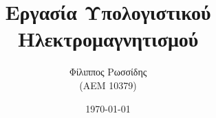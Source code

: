 \documentclass[10pt, letterpaper]{article}
\title{Εργασία Υπολογιστικού Ηλεκτρομαγνητισμού}
\author{Φίλιππος Ρωσσίδης \\ (ΑΕΜ 10379)}
\date{\today}
\newcommand{\en}{\selectlanguage{english}}
\newcommand{\gr}{\selectlanguage{greek}}
\begin{document}
\maketitle
  

\end{document}
